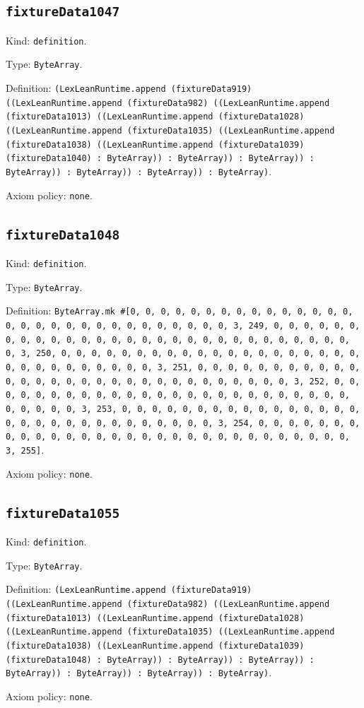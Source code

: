 \documentclass[11pt]{article}
\begin{document}
\subsection*{\texttt{fixtureData1047}}
\noindent Kind: \texttt{definition}.\par
\noindent Type: \texttt{ByteArray}.\par
\noindent Definition: \texttt{(LexLeanRuntime.append (fixtureData919) ((LexLeanRuntime.append (fixtureData982) ((LexLeanRuntime.append (fixtureData1013) ((LexLeanRuntime.append (fixtureData1028) ((LexLeanRuntime.append (fixtureData1035) ((LexLeanRuntime.append (fixtureData1038) ((LexLeanRuntime.append (fixtureData1039) (fixtureData1040) : ByteArray)) : ByteArray)) : ByteArray)) : ByteArray)) : ByteArray)) : ByteArray)) : ByteArray)}.\par
\noindent Axiom policy: \texttt{none}.\par
\subsection*{\texttt{fixtureData1048}}
\noindent Kind: \texttt{definition}.\par
\noindent Type: \texttt{ByteArray}.\par
\noindent Definition: \texttt{ByteArray.mk \#[0, 0, 0, 0, 0, 0, 0, 0, 0, 0, 0, 0, 0, 0, 0, 0, 0, 0, 0, 0, 0, 0, 0, 0, 0, 0, 0, 0, 0, 0, 3, 249, 0, 0, 0, 0, 0, 0, 0, 0, 0, 0, 0, 0, 0, 0, 0, 0, 0, 0, 0, 0, 0, 0, 0, 0, 0, 0, 0, 0, 0, 0, 3, 250, 0, 0, 0, 0, 0, 0, 0, 0, 0, 0, 0, 0, 0, 0, 0, 0, 0, 0, 0, 0, 0, 0, 0, 0, 0, 0, 0, 0, 0, 0, 3, 251, 0, 0, 0, 0, 0, 0, 0, 0, 0, 0, 0, 0, 0, 0, 0, 0, 0, 0, 0, 0, 0, 0, 0, 0, 0, 0, 0, 0, 0, 0, 3, 252, 0, 0, 0, 0, 0, 0, 0, 0, 0, 0, 0, 0, 0, 0, 0, 0, 0, 0, 0, 0, 0, 0, 0, 0, 0, 0, 0, 0, 0, 0, 3, 253, 0, 0, 0, 0, 0, 0, 0, 0, 0, 0, 0, 0, 0, 0, 0, 0, 0, 0, 0, 0, 0, 0, 0, 0, 0, 0, 0, 0, 0, 0, 3, 254, 0, 0, 0, 0, 0, 0, 0, 0, 0, 0, 0, 0, 0, 0, 0, 0, 0, 0, 0, 0, 0, 0, 0, 0, 0, 0, 0, 0, 0, 0, 3, 255]}.\par
\noindent Axiom policy: \texttt{none}.\par
\subsection*{\texttt{fixtureData1055}}
\noindent Kind: \texttt{definition}.\par
\noindent Type: \texttt{ByteArray}.\par
\noindent Definition: \texttt{(LexLeanRuntime.append (fixtureData919) ((LexLeanRuntime.append (fixtureData982) ((LexLeanRuntime.append (fixtureData1013) ((LexLeanRuntime.append (fixtureData1028) ((LexLeanRuntime.append (fixtureData1035) ((LexLeanRuntime.append (fixtureData1038) ((LexLeanRuntime.append (fixtureData1039) (fixtureData1048) : ByteArray)) : ByteArray)) : ByteArray)) : ByteArray)) : ByteArray)) : ByteArray)) : ByteArray)}.\par
\noindent Axiom policy: \texttt{none}.\par
\end{document}
